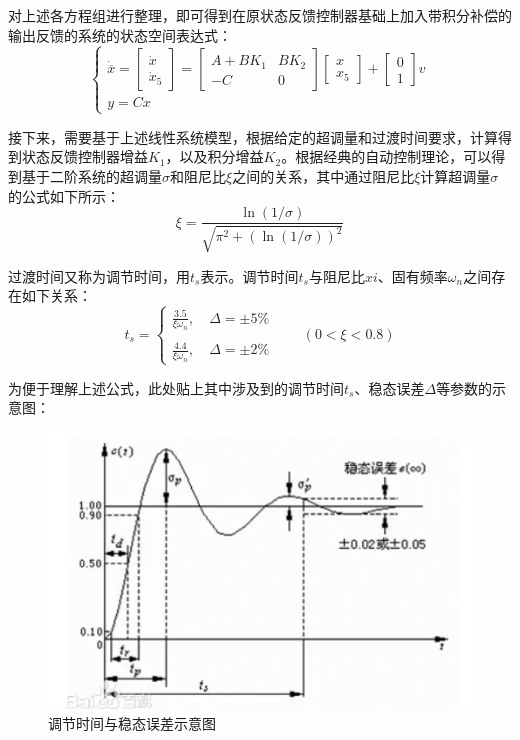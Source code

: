 \documentclass[UTF8]{article}
\begin{document}
对上述各方程组进行整理，即可得到在原状态反馈控制器基础上加入带积分补偿的输出反馈的系统的状态空间表达式：
\begin{equation*}
	\begin{cases}
		\dot{\overline{x}} = 
		\begin{bmatrix}
		\dot{x} \\
		\dot{x}_5
		\end{bmatrix} =
		\begin{bmatrix}
		A+BK_1 & BK_2 \\
		-C & 0
		\end{bmatrix}
		\begin{bmatrix}
		x \\
		x_5
		\end{bmatrix} +
		\begin{bmatrix}
		0 \\
		1
		\end{bmatrix}v \\
		
		y = Cx
	\end{cases}
\end{equation*}

接下来，需要基于上述线性系统模型，根据给定的超调量和过渡时间要求，计算得到状态反馈控制器增益$K_1$，以及积分增益$K_2$。根据经典的自动控制理论，可以得到基于二阶系统的超调量$\sigma$和阻尼比$\xi$之间的关系，其中通过阻尼比$\xi$计算超调量$\sigma$的公式如下所示：
\begin{equation*}
	\xi = \frac{\ln(1/\sigma)}{\sqrt{\pi^2 + (\ln(1/\sigma))^2}}
\end{equation*}

过渡时间又称为调节时间，用$t_s$表示。调节时间$t_s$与阻尼比$xi$、固有频率$\omega_n$之间存在如下关系：
\begin{equation*}
	t_s = 
	\begin{cases}
	\frac{3.5}{\xi\omega_n}, \quad \Delta = \pm5\% \\
	\\
	\frac{4.4}{\xi\omega_n}, \quad \Delta = \pm2\%
	\end{cases} \quad \quad 
	(0 < \xi < 0.8)
\end{equation*}

为便于理解上述公式，此处贴上其中涉及到的调节时间$t_s$、稳态误差$\Delta$等参数的示意图：
\begin{figure}[H]
    \centering %
    \includegraphics[width=.6\textwidth]{figure/调节时间示意图.png}
    \caption{调节时间与稳态误差示意图} %
\end{figure}
\end{document}
